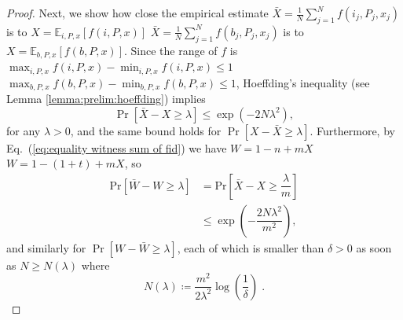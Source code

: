 \documentclass[a4paper,twocolumn,11pt,unpublished]{../../revision/quantumarticle}
\newcommand{\np}{m}
\providecommand{\DIFadd}[1]{{\protect\color{blue} \sf #1}} %
\providecommand{\DIFdel}[1]{{\protect\color{red} \scriptsize #1}} %
\providecommand{\DIFaddbegin}{} %
\providecommand{\DIFaddend}{} %
\providecommand{\DIFdelbegin}{} %
\providecommand{\DIFdelend}{} %
\begin{document}
\begin{proof}
        Next, we show how close the empirical estimate \DIFdelbegin \DIFdel{$\bar X=\frac{1}{N}\sum_{j=1}^Nf(i_j,P_j,x_j)$ is to $X=\mathbb E_{i,P,x}[f(i,P,x)]$}\DIFdelend \DIFaddbegin \DIFadd{$\bar X=\frac{1}{N}\sum_{j=1}^Nf(b_j,P_j,x_j)$ is to $X=\mathbb E_{b,P,x}[f(b,P,x)]$}\DIFaddend . Since the range of $f$ is \DIFdelbegin \DIFdel{$\max_{i,P,x}f(i,P,x)-\min_{i,P,x}f(i,P,x)\leq1$}\DIFdelend \DIFaddbegin \DIFadd{$\max_{b,P,x}f(b,P,x)-\min_{b,P,x}f(b,P,x)\leq1$}\DIFaddend , Hoeffding's inequality (see Lemma \ref{lemma:prelim:hoeffding}) implies
        \begin{equation}
            \Pr[
            \bar X - X \geq \lambda
            ] \leq \exp
            \left(
            -2N\lambda^2
            \right),
        \end{equation}
        for any $\lambda>0$, and the same bound holds for $\Pr[X - \bar X \geq \lambda]$.
        Furthermore, by Eq.\ (\ref{eq:equality witness sum of fid}) we have \DIFdelbegin \DIFdel{$W=1-n +\np X$}\DIFdelend \DIFaddbegin \DIFadd{$W=1-(1+t) +\np X$}\DIFaddend , so
        \begin{equation}
            \begin{aligned}
            \mathrm{Pr}[
            \bar W - W \geq \lambda
            ] &=
            \mathrm{Pr}\left[
            \bar X - X \geq \dfrac{\lambda}{\np}
            \right] \\
            &\leq
            \exp{
            \left(
            -\dfrac{2N \lambda^2}{\np^2}
            \right)
            },
            \end{aligned}
        \end{equation}
        and similarly for $\Pr[W - \bar W \geq \lambda]$, each of which is smaller than $\delta>0$ as soon as $N\ge N(\lambda)$ where
            \begin{equation}
                N(\lambda)\coloneqq\frac{\np^2}{2\lambda^2}\log\left(\dfrac{1}{\delta}\right)\; .
            \end{equation}


\end{proof}
\end{document}
